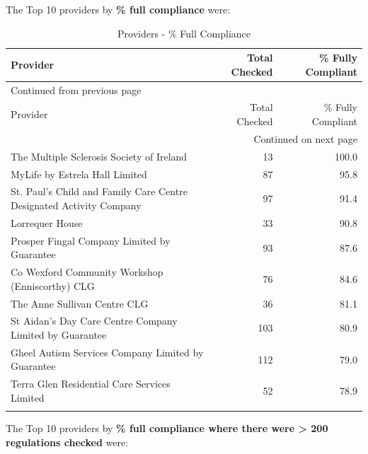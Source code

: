 \documentclass[a4paper,11pt,twoside]{article}
\begin{document}
The Top 10 providers by \textbf{\% full compliance} were:

\begin{longtable}{p{10cm}|r|r}
\caption{Providers - \% Full Compliance}
\\[0pt]
Provider & Total Checked & \% Fully Compliant\\[0pt]
\hline
\endfirsthead
\multicolumn{3}{l}{Continued from previous page} \\[0pt]
\hline

Provider & Total Checked & \% Fully Compliant \\[0pt]

\hline
\endhead
\hline\multicolumn{3}{r}{Continued on next page} \\
\endfoot
\endlastfoot
\hline
The Multiple Sclerosis Society of Ireland & 13 & 100.0\\[0pt]
MyLife by Estrela Hall Limited & 87 & 95.8\\[0pt]
St. Paul's Child and Family Care Centre Designated Activity Company & 97 & 91.4\\[0pt]
Lorrequer House & 33 & 90.8\\[0pt]
Prosper Fingal Company Limited by Guarantee & 93 & 87.6\\[0pt]
Co Wexford Community Workshop (Enniscorthy) CLG & 76 & 84.6\\[0pt]
The Anne Sullivan Centre CLG & 36 & 81.1\\[0pt]
St Aidan's Day Care Centre Company Limited by Guarantee & 103 & 80.9\\[0pt]
Gheel Autism Services Company Limited by Guarantee & 112 & 79.0\\[0pt]
Terra Glen Residential Care Services Limited & 52 & 78.9\\[0pt]
 &  & \\[0pt]
\end{longtable}

The Top 10 providers by \textbf{\% full compliance where there were > 200 regulations checked} were:
\end{document}
